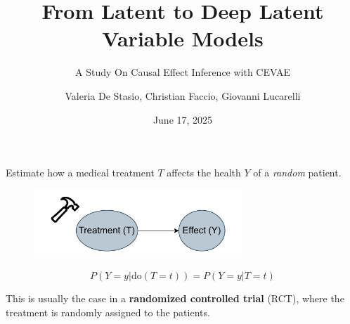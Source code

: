 \documentclass[10pt]{beamer}
\title{From Latent to Deep Latent Variable Models}
\subtitle{A Study On Causal Effect Inference with CEVAE}
\date{June 17, 2025}
\author[longname]{Valeria De Stasio, Christian Faccio, Giovanni Lucarelli}
\begin{document}
\maketitle
\begin{frame}{}
    Estimate how a medical treatment $T$ affects the health $Y$ of a \textit{random} patient.
  \begin{figure}
    \centering
    \includegraphics[width=0.7\textwidth]{images/no_confounders.pdf}
  \end{figure}

  \begin{equation*}
    P(Y=y|\text{do}(T=t))=P(Y=y|T=t)
  \end{equation*}
  
  This is usually the case in a \textbf{randomized controlled trial} (RCT), where the treatment is randomly assigned to the patients.

\end{frame}
\end{document}
